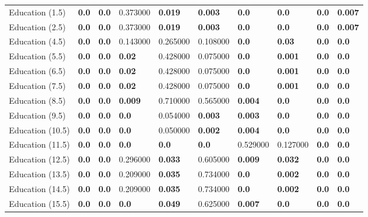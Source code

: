 \begin{tabular}{llllllllll}
Education (1.5) & \textbf{0.0} & \textbf{0.0} & 0.373000 & \textbf{0.019} & \textbf{0.003} & \textbf{0.0} & \textbf{0.0} & \textbf{0.0} & \textbf{0.007} \\
Education (2.5) & \textbf{0.0} & \textbf{0.0} & 0.373000 & \textbf{0.019} & \textbf{0.003} & \textbf{0.0} & \textbf{0.0} & \textbf{0.0} & \textbf{0.007} \\
Education (4.5) & \textbf{0.0} & \textbf{0.0} & 0.143000 & 0.265000 & 0.108000 & \textbf{0.0} & \textbf{0.03} & \textbf{0.0} & \textbf{0.0} \\
Education (5.5) & \textbf{0.0} & \textbf{0.0} & \textbf{0.02} & 0.428000 & 0.075000 & \textbf{0.0} & \textbf{0.001} & \textbf{0.0} & \textbf{0.0} \\
Education (6.5) & \textbf{0.0} & \textbf{0.0} & \textbf{0.02} & 0.428000 & 0.075000 & \textbf{0.0} & \textbf{0.001} & \textbf{0.0} & \textbf{0.0} \\
Education (7.5) & \textbf{0.0} & \textbf{0.0} & \textbf{0.02} & 0.428000 & 0.075000 & \textbf{0.0} & \textbf{0.001} & \textbf{0.0} & \textbf{0.0} \\
Education (8.5) & \textbf{0.0} & \textbf{0.0} & \textbf{0.009} & 0.710000 & 0.565000 & \textbf{0.004} & \textbf{0.0} & \textbf{0.0} & \textbf{0.0} \\
Education (9.5) & \textbf{0.0} & \textbf{0.0} & \textbf{0.0} & 0.054000 & \textbf{0.003} & \textbf{0.003} & \textbf{0.0} & \textbf{0.0} & \textbf{0.0} \\
Education (10.5) & \textbf{0.0} & \textbf{0.0} & \textbf{0.0} & 0.050000 & \textbf{0.002} & \textbf{0.004} & \textbf{0.0} & \textbf{0.0} & \textbf{0.0} \\
Education (11.5) & \textbf{0.0} & \textbf{0.0} & \textbf{0.0} & \textbf{0.0} & \textbf{0.0} & 0.529000 & 0.127000 & \textbf{0.0} & \textbf{0.0} \\
Education (12.5) & \textbf{0.0} & \textbf{0.0} & 0.296000 & \textbf{0.033} & 0.605000 & \textbf{0.009} & \textbf{0.032} & \textbf{0.0} & \textbf{0.0} \\
Education (13.5) & \textbf{0.0} & \textbf{0.0} & 0.209000 & \textbf{0.035} & 0.734000 & \textbf{0.0} & \textbf{0.002} & \textbf{0.0} & \textbf{0.0} \\
Education (14.5) & \textbf{0.0} & \textbf{0.0} & 0.209000 & \textbf{0.035} & 0.734000 & \textbf{0.0} & \textbf{0.002} & \textbf{0.0} & \textbf{0.0} \\
Education (15.5) & \textbf{0.0} & \textbf{0.0} & \textbf{0.0} & \textbf{0.049} & 0.625000 & \textbf{0.007} & \textbf{0.0} & \textbf{0.0} & \textbf{0.0} \\

\end{tabular}
